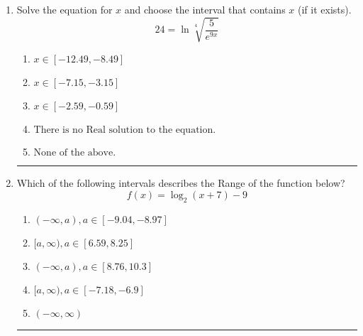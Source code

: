 \documentclass[14pt]{extbook}
\newcommand{\litem}[1]{\item#1\hspace*{-1cm}\rule{\textwidth}{0.4pt}}
\begin{document}
\begin{enumerate}
{\begin{enumerate}[label=\Alph*.]
\end{enumerate} }
\litem{
 Solve the equation for $x$ and choose the interval that contains $x$ (if it exists).\[  24 = \ln{\sqrt[4]{\frac{5}{e^{9x}}}} \]\begin{enumerate}[label=\Alph*.]
\item \( x \in [-12.49, -8.49] \)
\item \( x \in [-7.15, -3.15] \)
\item \( x \in [-2.59, -0.59] \)
\item \( \text{There is no Real solution to the equation.} \)
\item \( \text{None of the above.} \)

\end{enumerate} }
\litem{
Which of the following intervals describes the Range of the function below?\[ f(x) = \log_2{(x+7)}-9 \]\begin{enumerate}[label=\Alph*.]
\item \( (-\infty, a), a \in [-9.04, -8.97] \)
\item \( [a, \infty), a \in [6.59, 8.25] \)
\item \( (-\infty, a), a \in [8.76, 10.3] \)
\item \( [a, \infty), a \in [-7.18, -6.9] \)
\item \( (-\infty, \infty) \)

\end{enumerate} }
\end{enumerate}
\end{document}
